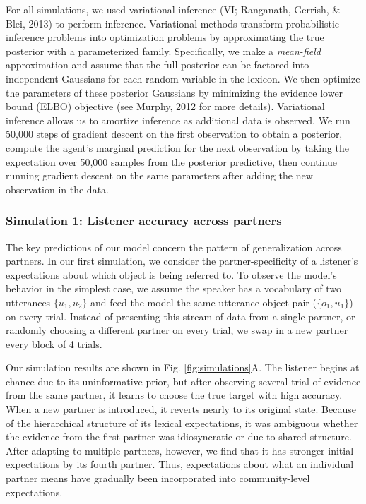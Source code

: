 \documentclass[10pt, letterpaper]{article}
\begin{document}
For all simulations, we used variational inference (VI; Ranganath,
Gerrish, \& Blei, 2013) to perform inference. Variational methods
transform probabilistic inference problems into optimization problems by
approximating the true posterior with a parameterized family.
Specifically, we make a \emph{mean-field} approximation and assume that
the full posterior can be factored into independent Gaussians for each
random variable in the lexicon. We then optimize the parameters of these
posterior Gaussians by minimizing the evidence lower bound (ELBO)
objective (see Murphy, 2012 for more details). Variational inference
allows us to amortize inference as additional data is observed. We run
50,000 steps of gradient descent on the first observation to obtain a
posterior, compute the agent's marginal prediction for the next
observation by taking the expectation over 50,000 samples from the
posterior predictive, then continue running gradient descent on the same
parameters after adding the new observation in the data.

\hypertarget{simulation-1-listener-accuracy-across-partners}{%
\subsubsection{Simulation 1: Listener accuracy across
partners}\label{simulation-1-listener-accuracy-across-partners}}

The key predictions of our model concern the pattern of generalization
across partners. In our first simulation, we consider the
partner-specificity of a listener's expectations about which object is
being referred to. To observe the model's behavior in the simplest case,
we assume the speaker has a vocabulary of two utterances
\(\{u_1, u_2\}\) and feed the model the same utterance-object pair
(\(\{o_1, u_1\}\)) on every trial. Instead of presenting this stream of
data from a single partner, or randomly choosing a different partner on
every trial, we swap in a new partner every block of 4 trials.

Our simulation results are shown in Fig. \ref{fig:simulations}A. The
listener begins at chance due to its uninformative prior, but after
observing several trial of evidence from the same partner, it learns to
choose the true target with high accuracy. When a new partner is
introduced, it reverts nearly to its original state. Because of the
hierarchical structure of its lexical expectations, it was ambiguous
whether the evidence from the first partner was idiosyncratic or due to
shared structure. After adapting to multiple partners, however, we find
that it has stronger initial expectations by its fourth partner. Thus,
expectations about what an individual partner means have gradually been
incorporated into community-level expectations.
\end{document}
